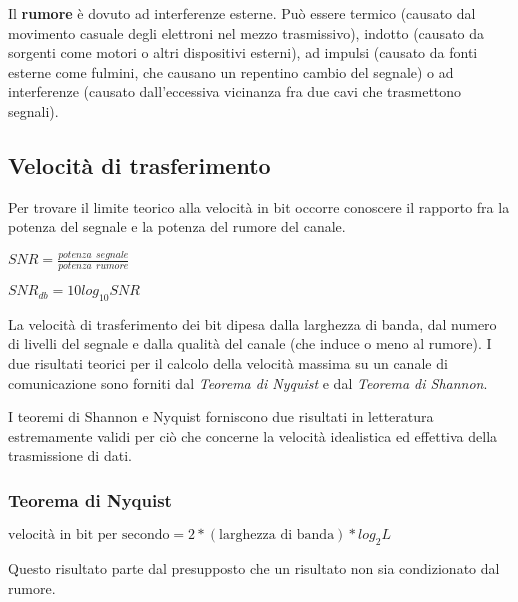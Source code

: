         Il \textbf{rumore} è dovuto ad interferenze esterne. Può essere termico (causato dal movimento casuale degli elettroni nel mezzo trasmissivo), indotto (causato da sorgenti come motori o altri dispositivi esterni), ad impulsi (causato da fonti esterne come fulmini, che causano un repentino cambio del segnale) o ad interferenze (causato dall'eccessiva vicinanza fra due cavi che trasmettono segnali).
    
    \subsection{Velocità di trasferimento}
    
        Per trovare il limite teorico alla velocità in bit occorre conoscere il rapporto fra la potenza del segnale e la potenza del rumore del canale.
    
        \begin{center}
            \(SNR = \frac{potenza\ \ segnale}{potenza\ \ rumore}\)
            
            \vspace{3mm}
            
            \(SNR_{db} = 10 log_{10} SNR\)
        \end{center}
        
        La velocità di trasferimento dei bit dipesa dalla larghezza di banda, dal numero di livelli del segnale e dalla qualità del canale (che induce o meno al rumore). I due risultati teorici per il calcolo della velocità massima su un canale di comunicazione sono forniti dal \textit{Teorema di Nyquist} e dal \textit{Teorema di Shannon}.
        
        I teoremi di Shannon e Nyquist forniscono due risultati in letteratura estremamente validi per ciò che concerne la velocità idealistica ed effettiva della trasmissione di dati.
        
        \subsubsection{Teorema di Nyquist}
        
            \(\text{velocità in bit per secondo}=2*(\text{larghezza di banda})*log_2 L\)
            
            \vspace{3mm}
            
            Questo risultato parte dal presupposto che un risultato non sia condizionato dal rumore.
            
